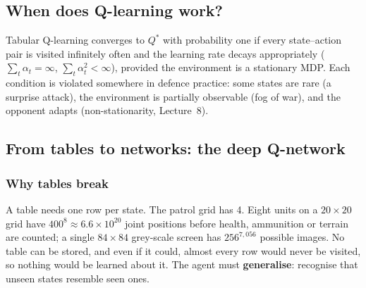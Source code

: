 \documentclass[11pt]{article}
\begin{document}
\subsection{When does Q-learning work?}
Tabular Q-learning converges to $Q^*$ with probability one if every state--action pair is visited infinitely often and the learning rate decays appropriately ($\sum_t\alpha_t=\infty$, $\sum_t\alpha_t^2<\infty$), provided the environment is a stationary MDP. Each condition is violated somewhere in defence practice: some states are rare (a surprise attack), the environment is partially observable (fog of war), and the opponent adapts (non-stationarity, Lecture~8).

\subsection{From tables to networks: the deep Q-network}
\subsubsection{Why tables break}
A table needs one row per state. The patrol grid has 4. Eight units on a $20\times20$ grid have $400^8\approx6.6\times10^{20}$ joint positions before health, ammunition or terrain are counted; a single $84\times84$ grey-scale screen has $256^{7{,}056}$ possible images. No table can be stored, and even if it could, almost every row would never be visited, so nothing would be learned about it. The agent must \textbf{generalise}: recognise that unseen states resemble seen ones.
\end{document}
